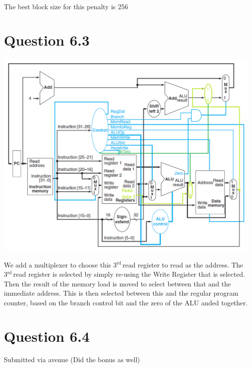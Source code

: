 \documentclass[11pt]{article} %
\newcommand{\rd}{$^{\text{rd}\ }$}
\begin{document}
The best block size for this penalty is 256

\section{Question 6.3}


\includegraphics[width=\textwidth]{CPU.png}

We add a multiplexer to choose this 3\rd read register to read as the address. The 3\rd read register is selected by simply re-using the Write Register that is selected. Then the result of the memory load is moved to select between that and the immediate address. This is then selected between this and the regular program counter, based on the branch control bit and the zero of the ALU anded together.

\section{Question 6.4}

Submitted via avenue (Did the bonus as well)
\end{document}
